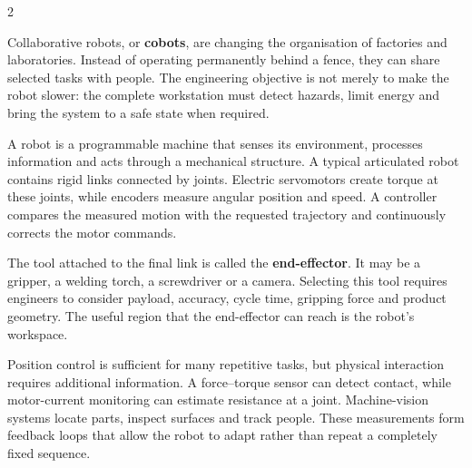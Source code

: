 

\begin{multicols}{2}
\begin{engineeringnews}
Collaborative robots, or \textbf{cobots}, are changing the organisation of factories and laboratories. Instead of operating permanently behind a fence, they can share selected tasks with people. The engineering objective is not merely to make the robot slower: the complete workstation must detect hazards, limit energy and bring the system to a safe state when required.
\end{engineeringnews}

\begin{ecarticle}
A robot is a programmable machine that senses its environment, processes information and acts through a mechanical structure. A typical articulated robot contains rigid links connected by joints. Electric servomotors create torque at these joints, while encoders measure angular position and speed. A controller compares the measured motion with the requested trajectory and continuously corrects the motor commands.

The tool attached to the final link is called the \textbf{end-effector}. It may be a gripper, a welding torch, a screwdriver or a camera. Selecting this tool requires engineers to consider payload, accuracy, cycle time, gripping force and product geometry. The useful region that the end-effector can reach is the robot's workspace.

Position control is sufficient for many repetitive tasks, but physical interaction requires additional information. A force--torque sensor can detect contact, while motor-current monitoring can estimate resistance at a joint. Machine-vision systems locate parts, inspect surfaces and track people. These measurements form feedback loops that allow the robot to adapt rather than repeat a completely fixed sequence.


\end{ecarticle}
\end{multicols}
